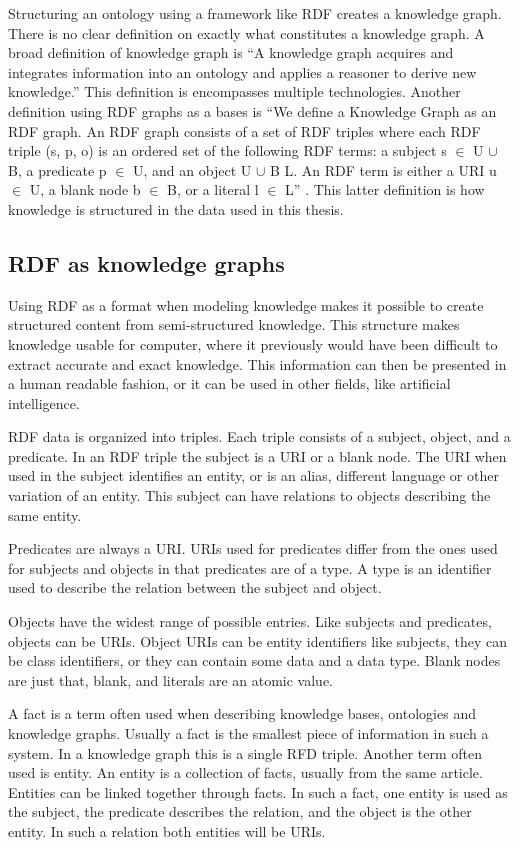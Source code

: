 Structuring an ontology using a framework like RDF creates a knowledge graph. There is no clear definition on exactly what constitutes a knowledge graph. A broad definition of knowledge graph is ``A knowledge graph acquires and integrates information into an ontology and applies a reasoner to derive new knowledge.'' \citep{KGDef} This definition is encompasses multiple technologies. Another definition using RDF graphs as a bases is ``We define a Knowledge Graph as an RDF graph. An RDF graph consists of a set of RDF triples where each RDF triple (s, p, o) is an ordered set of the following RDF terms: a subject s $\in$ U $\cup$ B, a predicate p $\in$ U, and an object U $\cup$ B  L. An RDF term is either a URI u $\in$ U, a blank node b $\in$ B, or a literal l $\in$ L'' \citep{KGDefYago}. This latter definition is how knowledge is structured in the data used in this thesis.

\subsection{RDF as knowledge graphs}
Using RDF as a format when modeling knowledge makes it possible to create structured content from semi-structured knowledge. This structure makes knowledge usable for computer, where it previously would have been difficult to extract accurate and exact knowledge. This information can then be presented in a human readable fashion, or it can be used in other fields, like artificial intelligence.

RDF data is organized into triples. Each triple consists of a subject, object, and a predicate. In an RDF triple the subject is a URI or a blank node. The URI when used in the subject identifies an entity, or is an alias, different language or other variation of an entity. This subject can have relations to objects describing the same entity.

Predicates are always a URI. URIs used for predicates differ from the ones used for subjects and objects in that predicates are of a type. A type is an identifier used to describe the relation between the subject and object.

Objects have the widest range of possible entries. Like subjects and predicates, objects can be URIs. Object URIs can be entity identifiers like subjects, they can be class identifiers, or they can contain some data and a data type. Blank nodes are just that, blank, and literals are an atomic value. 

A fact is a term often used when describing knowledge bases, ontologies and knowledge graphs. Usually a fact is the smallest piece of information in such a system. In a knowledge graph this is a single RFD triple. Another term often used is entity. An entity is a collection of facts, usually from the same article. Entities can be linked together through facts. In such a fact, one entity is used as the subject, the predicate describes the relation, and the object is the other entity. In such a relation both entities will be URIs.

